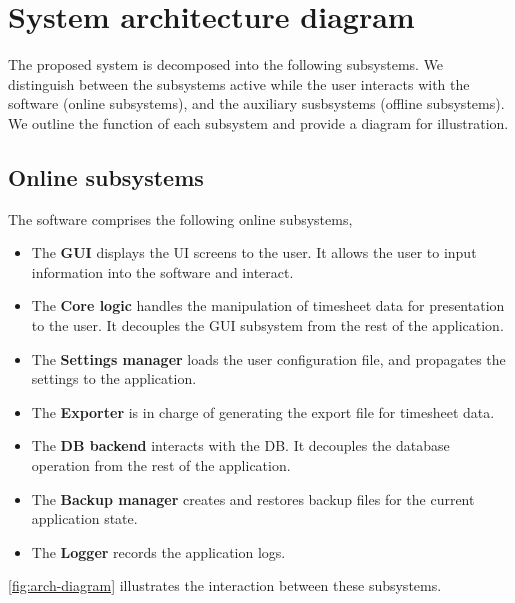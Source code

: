\section{System architecture diagram} \label{sec:system-diagram}
The proposed system is decomposed into the following subsystems. We distinguish
between the subsystems active while the user interacts with the software (online
subsystems), and the auxiliary susbsystems (offline subsystems). We outline
the function of each subsystem and provide a diagram for illustration.

\subsection{Online subsystems}
The software comprises the following online subsystems,
\begin{itemize}
\item The \textbf{\gls{GUI}} displays the \gls{UI} screens to the user. It
  allows the user to input information into the software and interact.
\item The \textbf{Core logic} handles the manipulation of timesheet data for
  presentation to the user. It decouples the \gls{GUI} subsystem from the rest
  of the application.
\item The \textbf{Settings manager} loads the user configuration file, and
  propagates the settings to the application.
\item The \textbf{Exporter} is in charge of generating the export file
  for timesheet data.
\item The \textbf{\gls{DB} backend} interacts with the \gls{DB}. It decouples
  the database operation from the rest of the application.
\item The \textbf{Backup manager} creates and restores backup files for the
  current application state.
\item The \textbf{Logger} records the application logs.
\end{itemize}

\cref{fig:arch-diagram} illustrates the interaction between these
subsystems.

